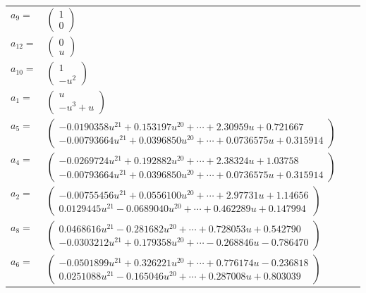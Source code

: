 \documentclass[1p]{elsarticle_modified}
\theoremstyle{definition}
\begin{document}
\begin{tabular}{m{7pt} m{180pt} m{7pt} m{180pt} }
\flushright $a_{9}=$&$\begin{pmatrix}1\\0\end{pmatrix}$ \\
\flushright $a_{12}=$&$\begin{pmatrix}0\\u\end{pmatrix}$ \\
\flushright $a_{10}=$&$\begin{pmatrix}1\\- u^2\end{pmatrix}$ \\
\flushright $a_{1}=$&$\begin{pmatrix}u\\- u^3+u\end{pmatrix}$ \\
\flushright $a_{5}=$&$\begin{pmatrix}-0.0190358 u^{21}+0.153197 u^{20}+\cdots+2.30959 u+0.721667\\-0.00793664 u^{21}+0.0396850 u^{20}+\cdots+0.0736575 u+0.315914\end{pmatrix}$ \\
\flushright $a_{4}=$&$\begin{pmatrix}-0.0269724 u^{21}+0.192882 u^{20}+\cdots+2.38324 u+1.03758\\-0.00793664 u^{21}+0.0396850 u^{20}+\cdots+0.0736575 u+0.315914\end{pmatrix}$ \\
\flushright $a_{2}=$&$\begin{pmatrix}-0.00755456 u^{21}+0.0556100 u^{20}+\cdots+2.97731 u+1.14656\\0.0129445 u^{21}-0.0689040 u^{20}+\cdots+0.462289 u+0.147994\end{pmatrix}$ \\
\flushright $a_{8}=$&$\begin{pmatrix}0.0468616 u^{21}-0.281682 u^{20}+\cdots+0.728053 u+0.542790\\-0.0303212 u^{21}+0.179358 u^{20}+\cdots-0.268846 u-0.786470\end{pmatrix}$ \\
\flushright $a_{6}=$&$\begin{pmatrix}-0.0501899 u^{21}+0.326221 u^{20}+\cdots+0.776174 u-0.236818\\0.0251088 u^{21}-0.165046 u^{20}+\cdots+0.287008 u+0.803039\end{pmatrix}$ \\

\end{tabular}
\end{document}
